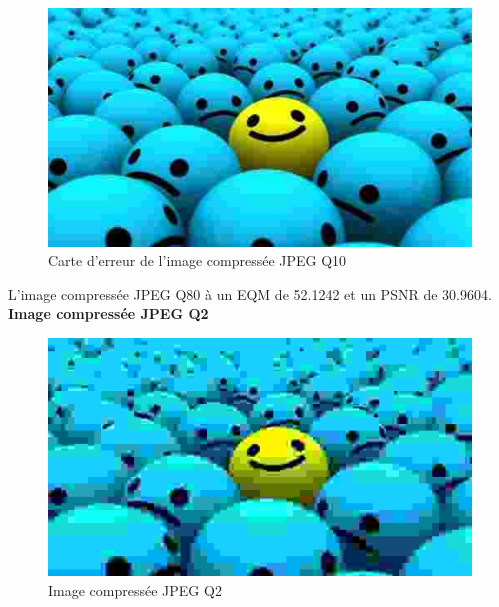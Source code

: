 \documentclass[12pt]{report}
\begin{document}
\begin{figure}[H]
\begin{center}
\includegraphics[scale=0.5]{../smileyDegQ10.jpg} 
\caption{Carte d'erreur de l'image compressée JPEG Q10 }
\end{center}
\end{figure}

L'image compressée JPEG Q80 à un EQM de 52.1242 et un PSNR de 30.9604.\\

\textbf{Image compressée JPEG Q2}

\begin{figure}[H]
\begin{center}
\includegraphics[scale=0.5]{../smileyDegQ2.jpg} 
\caption{Image compressée JPEG Q2 }
\end{center}
\end{figure}
\end{document}
